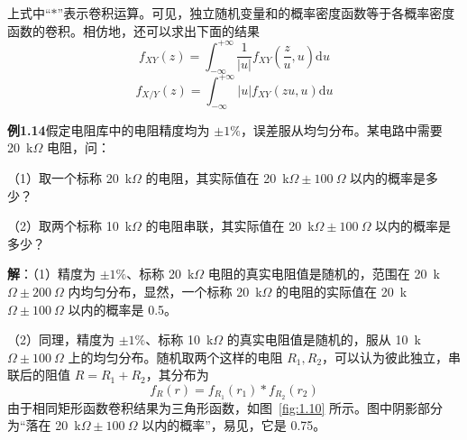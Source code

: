 \documentclass[11pt,openany,UTF8]{ctexbook}
\newcommand{\dif}{\mathrm{d}}                      %
\begin{document}
上式中“$*$”表示卷积运算\nobreak。可见\nobreak，独立随机变量和的概率密度函数等于各概率密度函数的卷积\nobreak。相仿地\nobreak，还可以求出下面的结果
\begin{equation}
f_{XY}(z)=\int_{-\infty}^{+\infty}\frac{1}{\lvert u\rvert}f_{XY}\left(\frac{z}{u},u\right)\dif u
\label{eq:1.38}
\end{equation}
\begin{equation}
f_{X/Y}(z)=\int_{-\infty}^{+\infty}\lvert u\rvert f_{XY}(zu,u)\dif u
\label{eq:1.39}
\end{equation}

\begin{examplebox}
\textbf{例1.14}\quad 假定电阻库中的电阻精度均为 $\pm 1\%$\nobreak，误差服从均匀分布\nobreak。某电路中需要 20~k$\Omega$ 电阻\nobreak，问\nobreak：

（1\nobreak）取一个标称 20~k$\Omega$ 的电阻\nobreak，其实际值在 20~k$\Omega\pm 100~\Omega$ 以内的概率是多少\nobreak？

（2\nobreak）取两个标称 10~k$\Omega$ 的电阻串联\nobreak，其实际值在 20~k$\Omega\pm 100~\Omega$ 以内的概率是多少\nobreak？

\textbf{解}\nobreak：（1\nobreak）精度为 $\pm 1\%$\nobreak、标称 20~k$\Omega$ 电阻的真实电阻值是随机的\nobreak，范围在 20~k$\Omega\pm 200~\Omega$ 内均匀分布\nobreak，显然\nobreak，一个标称 20~k$\Omega$ 的电阻的实际值在 20~k$\Omega\pm 100~\Omega$ 以内的概率是 0.5\nobreak。

（2\nobreak）同理\nobreak，精度为 $\pm 1\%$\nobreak、标称 10~k$\Omega$ 的真实电阻值是随机的\nobreak，服从 10~k$\Omega\pm 100~\Omega$ 上的均匀分布\nobreak。随机取两个这样的电阻 $R_1,R_2$\nobreak，可以认为彼此独立\nobreak，串联后的阻值 $R=R_1+R_2$\nobreak，其分布为
\[
f_R(r)=f_{R_1}(r_1)*f_{R_2}(r_2)
\]
由于相同矩形函数卷积结果为三角形函数\nobreak，如图~\ref{fig:1.10} 所示\nobreak。图中阴影部分为“落在 20~k$\Omega\pm 100~\Omega$ 以内的概率”\nobreak，易见\nobreak，它是 0.75\nobreak。


\end{examplebox}
\end{document}
